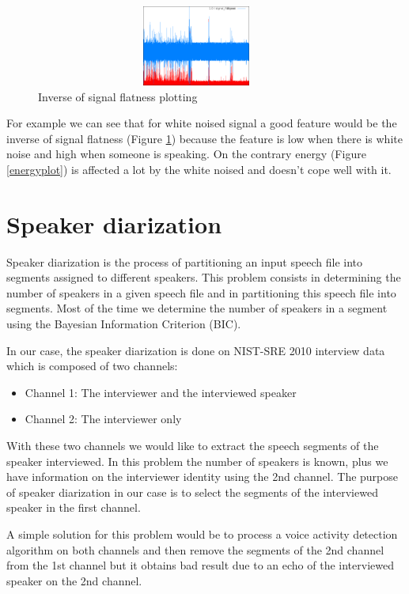\documentclass{techrep} %
\begin{document}
\begin{figure}[H]
  \centering \includegraphics[width=400px,
    height=100px]{signal_flatness}
  \caption{Inverse of signal flatness plotting}
  \label{signalflatness}
\end{figure}

For example we can see that for white noised signal a good feature
would be the inverse of signal flatness (Figure \ref{signalflatness})
because the feature is low when there is white noise and high when
someone is speaking. On the contrary energy (Figure \ref{energyplot})
is affected a lot by the white noised and doesn't cope well with it.

\section{Speaker diarization}
Speaker diarization is the process of partitioning an input speech
file into segments assigned to different speakers. This problem
consists in determining the number of speakers in a given speech file
and in partitioning this speech file into segments.  Most of the time
we determine the number of speakers in a segment using the Bayesian Information
Criterion (BIC).

In our case, the speaker diarization is done on NIST-SRE 2010 interview
data which is composed of two channels:
\begin{itemize}
\item Channel 1: The interviewer and the interviewed speaker
\item Channel 2: The interviewer only
\end{itemize}
With these two channels we would like to extract the speech segments
of the speaker interviewed. In this problem the number of speakers is
known, plus we have information on the interviewer identity using the
2nd channel. The purpose of speaker diarization in our case is to
select the segments of the interviewed speaker in the first channel.

A simple solution for this problem would be to process a voice
activity detection algorithm on both channels and then remove the
segments of the 2nd channel from the 1st channel but it obtains bad
result due to an echo of the interviewed speaker on the 2nd channel.
\end{document}
